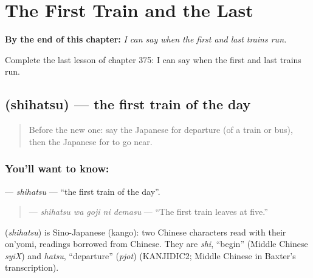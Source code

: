 
\chapter{The First Train and the Last}
\label{ch:ja-the-first-train-and-the-last}

\begin{chapteropening}
\textbf{By the end of this chapter:} \emph{I can say when the first and last trains run.}

Complete the last lesson of chapter 375: I can say when the first and last trains run.
\end{chapteropening}

\section[\texorpdfstring{\ja{しはつ} (shihatsu)}{しはつ (shihatsu)}]{ (shihatsu) — the first train of the day}

\label{lesson:JA-C375-shihatsu}



\begin{quote}
Before the new one: say the Japanese for departure (of a train or bus), then the Japanese for to go near.
\end{quote}

\subsection*{You'll want to know: }
\textbf{} — \emph{shihatsu} — \textquotedblleft{}the first train of the day\textquotedblright{}.

\begin{quote}
\textbf{  } — \emph{shihatsu wa goji ni demasu} — \textquotedblleft{}The first train leaves at five.\textquotedblright{}
\end{quote}

\begin{cousinweb}
\textbf{} (\emph{shihatsu}) is Sino-Japanese (kango): two Chinese characters read with their on'yomi, readings borrowed from Chinese. They are \emph{shi}, \textquotedblleft{}begin\textquotedblright{} (Middle Chinese \emph{syiX}) and \emph{hatsu}, \textquotedblleft{}departure\textquotedblright{} (\emph{pjot}) (KANJIDIC2; Middle Chinese in Baxter's transcription).
\end{cousinweb}

